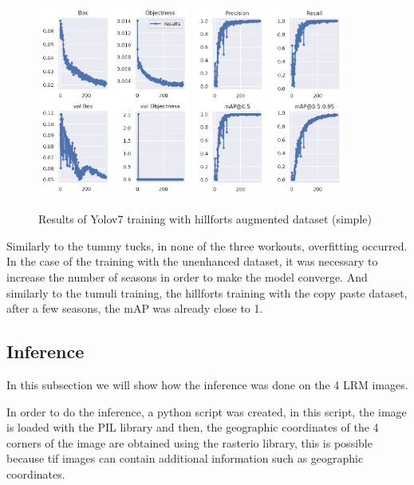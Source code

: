 \begin{figure}[H]
    \centering
    {{\includegraphics[width=5cm]{images/training/castros/maia1.png} }}
    \qquad
    {{\includegraphics[width=5cm]{images/training/castros/maia2.png} }}
    \caption{Results of Yolov7 training with hillforts augmented dataset (simple)}
    \label{fig:example}
\end{figure}

Similarly to the tummy tucks, in none of the three workouts, overfitting occurred. In the case of the training with the unenhanced dataset, it was necessary to increase the number of seasons in order to make the model converge. And similarly to the tumuli training, the hillforts training with the copy paste dataset, after a few seasons, the mAP was already close to 1.

\subsection{Inference}
In this subsection we will show how the inference was done on the 4 LRM images.

In order to do the inference, a python script was created, in this script, the image is loaded with the PIL library and then, the geographic coordinates of the 4 corners of the image are obtained using the rasterio library, this is possible because tif images can contain additional information such as geographic coordinates. 

